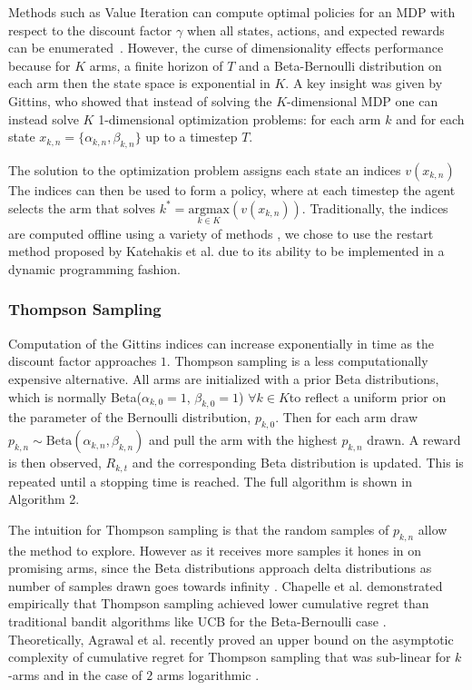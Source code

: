 \documentclass[10pt, conference]{ieeeconf}      %
\begin{document}
Methods such as Value Iteration can compute optimal policies for an MDP with respect to the discount factor $\gamma$ when all states, actions, and expected rewards can be enumerated~\cite{weber1992gittins,barto1998reinforcement}.
However, the curse of dimensionality effects performance because for $K$ arms, a finite horizon of $T$ and a Beta-Bernoulli distribution on each arm then the state space is exponential in $K$.
A key insight was given by Gittins, who showed that instead of solving the $K$-dimensional MDP one can instead solve $K$ 1-dimensional optimization problems: for each arm $k$ and for each state $x_{k,n} = \lbrace \alpha_{k,n}, \beta_{k,n} \rbrace$ up to a timestep $T$. 

The solution to the optimization problem assigns each state an indices $v(x_{k,n})$
 The indices can then be used to form a policy, where at each timestep the agent selects the arm that solves $k^* = \underset{k\in K}{\mbox{argmax}}(v(x_{k,n}))$.  Traditionally, the indices are computed offline using a variety of methods \cite{weber1992gittins}, we chose to use the restart method proposed by Katehakis et al. \cite{katehakis1987multi} due to its ability to be implemented in a dynamic programming fashion. 
 

\subsubsection{Thompson Sampling}
Computation of the Gittins indices can increase exponentially in time as the discount factor approaches $1$. 
Thompson sampling is a less computationally expensive alternative.
All arms are initialized with a prior Beta distributions, which is normally Beta($\alpha_{k,0}=1$,  $\beta_{k,0} =1$) $\forall k \in K$to reflect a uniform prior on the parameter of the Bernoulli distribution, $p_{k,0}$.
Then for each arm draw $p_{k,n} \sim \mbox{Beta}(\alpha_{k,n},\beta_{k,n})$ and pull the arm with the highest $p_{k,n}$ drawn.
A reward is then observed, $R_{k,t}$ and the corresponding Beta distribution is updated. This is repeated until a stopping time is reached. The full algorithm is shown in Algorithm 2.  

The intuition for Thompson sampling is that the random samples of $p_{k,n}$ allow the method to explore. However as it receives more samples it hones in on promising arms, since the Beta distributions approach delta distributions as number of samples drawn goes towards infinity \cite{goetschalckx2011continuous}. Chapelle et al. demonstrated empirically that Thompson sampling achieved lower cumulative regret than traditional bandit algorithms like UCB for the Beta-Bernoulli case \cite{chapelle2011empirical}. Theoretically, Agrawal et al. recently proved an upper bound on the asymptotic complexity of  cumulative regret for  Thompson sampling that was sub-linear  for $k$ -arms and in the case of $2$ arms logarithmic \cite{agrawal2011analysis}. 
\end{document}
